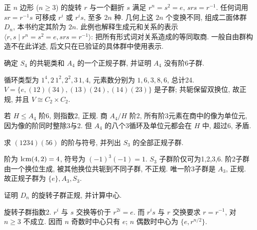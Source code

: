正 $n$ 边形 ($n\ge3$) 的旋转 $r$ 与一个翻折 $s$ 满足 $r^n=s^2=e$, $srs=r^{-1}$. 任何词用 $sr=r^{-1}s$ 可移成 $r^i$ 或 $r^is$, 至多 $2n$ 种. 几何上这 $2n$ 个变换不同, 组成二面体群 $D_n$, 本书约定其阶为 $2n$. 此例也解释生成元和关系的表示 $\langle r,s\mid r^n=s^2=e,srs=r^{-1}\rangle$: 把所有形式词对关系造成的等同取商. 一般自由群构造不在此详述, 后文只在已验证的具体群中使用表示.
\begin{example}确定 $S_4$ 的共轭类和 $A_4$ 的一个正规子群, 并证明 $A_4$ 没有阶6子群.\end{example}
\begin{solution}
循环类型为 $1^4,2\,1^2,2^2,3\,1,4$, 元素数分别为 $1,6,3,8,6$, 总计24. $V=\{e,(12)(34),(13)(24),(14)(23)\}$ 是子群; 共轭保留双换位, 故正规, 并且 $V\cong C_2\times C_2$.

若 $H\le A_4$ 阶6, 则指数2, 正规. 商 $A_4/H$ 阶2, 所有阶3元素在商中的像为单位元, 因为像的阶同时整除3与2. 但 $A_4$ 的八个3循环及单位元都会在 $H$ 中, 超过6, 矛盾.
\end{solution}
\begin{exercise}求 $(1234)(56)$ 的阶与符号, 并列出 $S_3$ 的全部正规子群.\end{exercise}
\begin{solution}
阶为 $\operatorname{lcm}(4,2)=4$, 符号为 $(-1)^3(-1)=1$. $S_3$ 子群阶仅可为1,2,3,6. 阶2子群由一个换位生成, 被其他换位共轭到不同子群, 不正规. 唯一阶3子群是 $A_3$, 正规. 故正规子群为 $\{e\},A_3,S_3$.
\end{solution}
\begin{exercise}证明 $D_n$ 的旋转子群正规, 并计算中心.\end{exercise}
\begin{solution}
旋转子群指数2. $r^i$ 与 $s$ 交换等价于 $r^{2i}=e$. 而 $r^is$ 与 $r$ 交换要求 $r=r^{-1}$, 对 $n\ge3$ 不成立. 因而 $n$ 奇数时中心只有 $e$; $n$ 偶数时中心为 $\{e,r^{n/2}\}$.
\end{solution}
